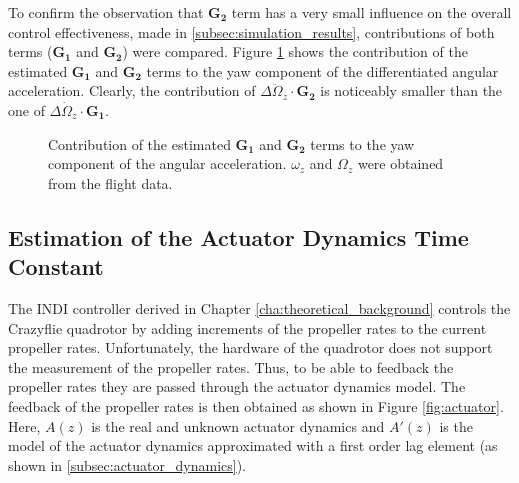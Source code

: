 \documentclass[11pt, a4paper, twoside]{report}
\begin{document}
To confirm the observation that $\bm{G_2}$ term has a very small influence on the overall control effectiveness, made in \ref{subsec:simulation_results}, contributions of both terms ($\bm{G_1}$ and $\bm{G_2}$) were compared. Figure \ref{fig:g2_comparison} shows the contribution of the estimated $\bm{G_1}$ and $\bm{G_2}$ terms to the yaw component of the differentiated angular acceleration. Clearly, the contribution of $\Delta\ddot{\Omega}_z \cdot \bm{G_2}$ is noticeably smaller than the one of $\Delta\dot{\Omega}_z \cdot \bm{G_1}$.

\begin{figure}[H]
	\centering 
	\captionsetup{justification=centering, singlelinecheck=off, font=bf, belowskip=-0.5cm}
	\caption[Contribution of control effectiveness terms to the angular acceleration]{Contribution of the estimated $\bm{G_1}$ and $\bm{G_2}$ terms to the yaw component of the angular acceleration. $\omega_z$ and $\Omega_z$ were obtained from the flight data.}
	\label{fig:g2_comparison}
\end{figure}

\subsection{Estimation of the Actuator Dynamics Time Constant} \label{subsec:time_const_estimation}

The \acrshort{INDI} controller derived in Chapter \ref{cha:theoretical_background} controls the Crazyflie quadrotor by adding increments of the propeller rates to the current propeller rates. Unfortunately, the hardware of the quadrotor does not support the measurement of the propeller rates. Thus, to be able to feedback the propeller rates they are passed through the actuator dynamics model. The feedback of the propeller rates is then obtained as shown in Figure \ref{fig:actuator}. Here, $A(z)$ is the real and unknown actuator dynamics and $A'(z)$ is the model of the actuator dynamics approximated with a first order lag element (as shown in \ref{subsec:actuator_dynamics}).
\end{document}
